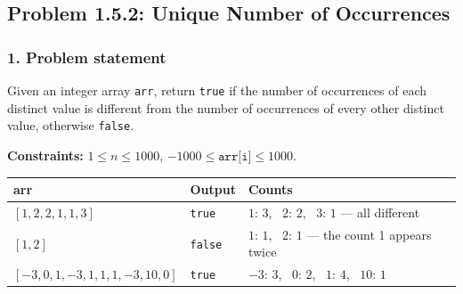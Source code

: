 \subsection{Problem 1.5.2: Unique Number of Occurrences}


\subsubsection*{1. Problem statement}

Given an integer array \texttt{arr}, return \texttt{true} if the number of occurrences of each distinct value is different from the number of occurrences of every other distinct value, otherwise \texttt{false}.

\textbf{Constraints:} $1 \le n \le 1000$, \; $-1000 \le \texttt{arr[i]} \le 1000$.

\begin{table}[H]
\centering\small
\begin{tabular}{@{}lll@{}}
\toprule
\textbf{arr} & \textbf{Output} & \textbf{Counts} \\
\midrule
$[1,2,2,1,1,3]$ & \texttt{true} & $1{:}\,3$, \ $2{:}\,2$, \ $3{:}\,1$ --- all different \\
$[1,2]$ & \texttt{false} & $1{:}\,1$, \ $2{:}\,1$ --- the count 1 appears twice \\
$[-3,0,1,-3,1,1,1,-3,10,0]$ & \texttt{true} & $-3{:}\,3$, \ $0{:}\,2$, \ $1{:}\,4$, \ $10{:}\,1$ \\
\bottomrule
\end{tabular}
\end{table}

